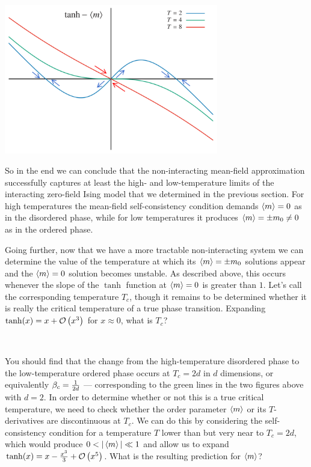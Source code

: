 \begin{center}\includegraphics[width=0.7\textwidth]{figs/unit09_consistency_flow.pdf}\end{center}

So in the end we can conclude that the non-interacting mean-field approximation successfully captures at least the high- and low-temperature limits of the interacting zero-field Ising model that we determined in the previous section.
For high temperatures the mean-field self-consistency condition demands $\left\langle m \right\rangle = 0$ as in the disordered phase, while for low temperatures it produces $\left\langle m \right\rangle = \pm m_0 \ne 0$ as in the ordered phase.

Going further, now that we have a more tractable non-interacting system we can determine the value of the temperature at which its $\left\langle m \right\rangle = \pm m_0$ solutions appear and the $\left\langle m \right\rangle = 0$ solution becomes unstable.
As described above, this occurs whenever the slope of the $\tanh$ function at $\left\langle m \right\rangle = 0$ is greater than $1$.
Let's call the corresponding temperature $T_c$, though it remains to be determined whether it is really the critical temperature of a true phase transition.
Expanding $\tanh(x) = x + \mathcal O\left(x^3\right)$ for $x \approx 0$, what is $T_c$?
\begin{mdframed}
  \ \\[50 pt]
\end{mdframed}

You should find that the change from the high-temperature disordered phase to the low-temperature ordered phase occurs at $T_c = 2d$ in $d$ dimensions, or equivalently $\beta_c = \frac{1}{2d}$ --- corresponding to the green lines in the two figures above with $d = 2$.
In order to determine whether or not this is a true critical temperature, we need to check whether the order parameter $\left\langle m \right\rangle$ or its $T$-derivatives are discontinuous at $T_c$.
We can do this by considering the self-consistency condition for a temperature $T$ lower than but very near to $T_c = 2d$, which would produce $0 < |\left\langle m \right\rangle| \ll 1$ and allow us to expand $\tanh(x) = x - \frac{x^3}{3} + \mathcal O\left(x^5\right)$.
What is the resulting prediction for $\left\langle m \right\rangle$?
\begin{mdframed}
  \ \\[100 pt]
\end{mdframed}

